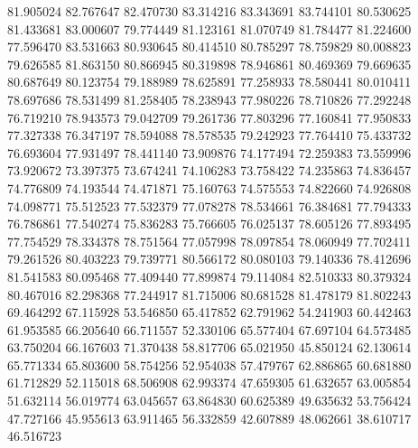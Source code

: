 81.905024
82.767647
82.470730
83.314216
83.343691
83.744101
80.530625
81.433681
83.000607
79.774449
81.123161
81.070749
81.784477
81.224600
77.596470
83.531663
80.930645
80.414510
80.785297
78.759829
80.008823
79.626585
81.863150
80.866945
80.319898
78.946861
80.469369
79.669635
80.687649
80.123754
79.188989
78.625891
77.258933
78.580441
80.010411
78.697686
78.531499
81.258405
78.238943
77.980226
78.710826
77.292248
76.719210
78.943573
79.042709
79.261736
77.803296
77.160841
77.950833
77.327338
76.347197
78.594088
78.578535
79.242923
77.764410
75.433732
76.693604
77.931497
78.441140
73.909876
74.177494
72.259383
73.559996
73.920672
73.397375
73.674241
74.106283
73.758422
74.235863
74.836457
74.776809
74.193544
74.471871
75.160763
74.575553
74.822660
74.926808
74.098771
75.512523
77.532379
77.078278
78.534661
76.384681
77.794333
76.786861
77.540274
75.836283
75.766605
76.025137
78.605126
77.893495
77.754529
78.334378
78.751564
77.057998
78.097854
78.060949
77.702411
79.261526
80.403223
79.739771
80.566172
80.080103
79.140336
78.412696
81.541583
80.095468
77.409440
77.899874
79.114084
82.510333
80.379324
80.467016
82.298368
77.244917
81.715006
80.681528
81.478179
81.802243
69.464292
67.115928
53.546850
65.417852
62.791962
54.241903
60.442463
61.953585
66.205640
66.711557
52.330106
65.577404
67.697104
64.573485
63.750204
66.167603
71.370438
58.817706
65.021950
45.850124
62.130614
65.771334
65.803600
58.754256
52.954038
57.479767
62.886865
60.681880
61.712829
52.115018
68.506908
62.993374
47.659305
61.632657
63.005854
51.632114
56.019774
63.045657
63.864830
60.625389
49.635632
53.756424
47.727166
45.955613
63.911465
56.332859
42.607889
48.062661
38.610717
46.516723
